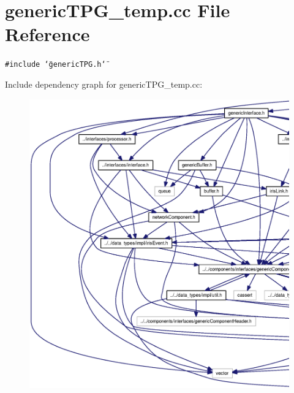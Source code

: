 \section{genericTPG\_\-temp.cc File Reference}
\label{genericTPG__temp_8cc}
{\tt \#include \char`\"{}genericTPG.h\char`\"{}}\par


Include dependency graph for genericTPG\_\-temp.cc:\nopagebreak
\begin{figure}[H]
\begin{center}
\leavevmode
\includegraphics[width=420pt]{genericTPG__temp_8cc__incl}
\end{center}
\end{figure}
